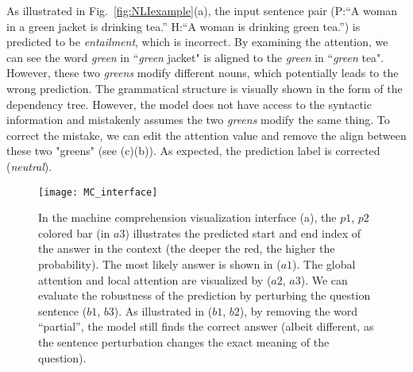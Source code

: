 As illustrated in Fig.~\ref{fig:NLIexample}(a), the input sentence pair (P:``A woman in a green jacket is drinking tea.'' H:``A woman is drinking green tea.'') is predicted to be \emph{entailment}, which is incorrect.
By examining the attention, we can see the word \emph{green} in ``\emph{green} jacket" is aligned to the \emph{green} in ``\emph{green} tea". However, these two \emph{greens} modify different nouns, which potentially leads to the wrong prediction. The grammatical structure is visually shown in the form of the dependency tree.
However, the model does not have access to the syntactic information and mistakenly assumes the two \emph{greens} modify the same thing.
%
To correct the mistake, we can edit the attention value and remove the align between these two "greens" (see (c)(b)).
As expected, the prediction label is corrected (\emph{neutral}).

\begin{figure*}[t]
\centering
 \texttt{[image: MC\_interface]}
  \vspace{-6mm}
 \caption{
In the machine comprehension visualization interface (a), the $p1$, $p2$ colored bar (in $a3$) illustrates the predicted start and end index of the answer in the context (the deeper the red, the higher the probability). The most likely answer is shown in ($a1$). The global attention and local attention are visualized by ($a2$, $a3$).
%
We can evaluate the robustness of the prediction by perturbing the question sentence ($b1$, $b3$). As illustrated in ($b1$, $b2$), by removing the word ``partial'', the model still finds the correct answer (albeit different, as the sentence perturbation changes the exact meaning of the question). 
}
\vspace{-2mm}
\label{fig:MCexample}
\end{figure*}

